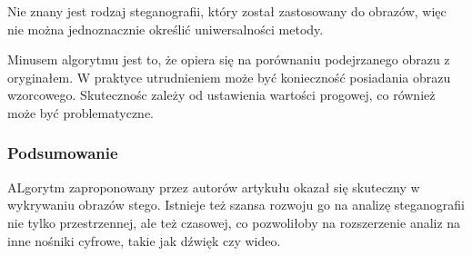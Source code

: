 Nie znany jest rodzaj steganografii, który został zastosowany do obrazów, więc nie można jednoznacznie określić 
uniwersalności metody. 

Minusem algorytmu jest to, że opiera się na porównaniu podejrzanego obrazu z oryginałem. W praktyce utrudnieniem 
może być konieczność posiadania obrazu wzorcowego. Skutecznośc zależy od ustawienia wartości progowej, co 
również może być problematyczne.

\subsubsection{Podsumowanie}
ALgorytm zaproponowany przez autorów artykułu okazał się skuteczny w wykrywaniu obrazów stego. Istnieje też 
szansa rozwoju go na analizę steganografii nie tylko przestrzennej, ale też czasowej, co pozwoliłoby na rozszerzenie 
analiz na inne nośniki cyfrowe, takie jak dźwięk czy wideo.

